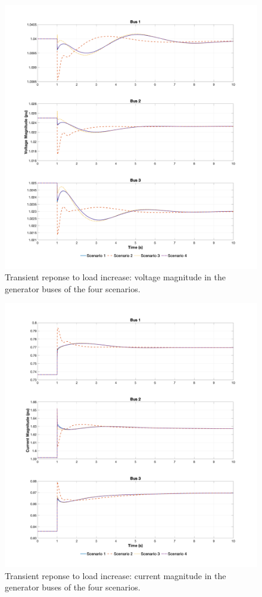 \newpage
\begin{figure}[ht!]
    \centering
    \includegraphics[width = \linewidth]{images/voltage_load_increase.png}
    \caption{Transient reponse to load increase: voltage magnitude in the generator buses of the four scenarios.}
    \label{fig:voltage_load_increase}
\end{figure}

\newpage
\begin{figure}[ht!]
    \centering
    \includegraphics[width = \linewidth]{images/current_load_increase.png}
    \caption{Transient reponse to load increase: current magnitude in the generator buses of the four scenarios.}
    \label{fig:current_load_increase}
\end{figure}

